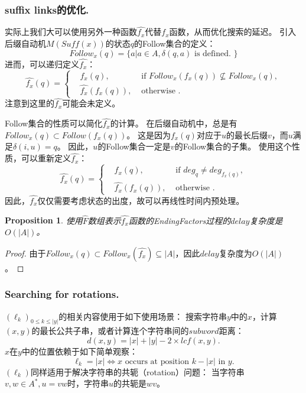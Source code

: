 \documentclass[UTF8]{ctexart}
\newtheorem{prop}[thm]{Proposition}
\theoremstyle{definition}
\theoremstyle{remark}
\numberwithin{equation}{subsection}
\newcommand{\Suff}{\textit{Suff}}
\begin{document}
\subsubsection{suffix links的优化.}	
	
	实际上我们大可以使用另外一种函数$\hat{f_x}$代替$f_x$函数，从而优化搜索的延迟。
	引入后缀自动机$M(\Suff(x))$的状态$q$的Follow集合的定义：
	\[
		Follow_x(q) = \{ a | a \in A, \delta(q, a) \text{ is defined. } \}
	\]
	进而，可以递归定义$\hat{f_x}$：
	\[
		\hat{f_x}(q) =
		\left\{
			\begin{aligned}
				&f_x(q),			&\text{ if } Follow_x(f_x(q)) \nsubseteq Follow_x(q),	\\
				&\hat{f_x}(f_x(q)),	&\text{ otherwise }.
			\end{aligned}
		\right .
	\]
	注意到这里的$\hat{f_x}$可能会未定义。
	
	Follow集合的性质可以简化$\hat{f_x}$的计算。
	在后缀自动机中，总是有$Follow_x(q) \subset Follow(f_x(q))$。
	这是因为$f_x(q)$对应于$u$的最长后缀$v$，而$u$满足$\delta(i, u) = q$。
	因此，$u$的Follow集合一定是$v$的Follow集合的子集。
	使用这个性质，可以重新定义$\hat{f_x}$：
	\[
		\hat{f_x}(q) =
		\left\{
			\begin{aligned}
				&f_x(q),		&\text{ if } deg_q \neq deg_{f_x(q)},	\\
				&\hat{f_x}(f_x(q)),	&\text{ otherwise }.
			\end{aligned}
		\right .
	\]
	因此，$\hat{f_x}$仅仅需要考虑状态的出度，故可以再线性时间内预处理。
	
	\begin{prop}
		使用$\hat{F}$数组表示$\hat{f_x}$函数的EndingFactors过程的$delay$复杂度是$O(|A|)$。
	\end{prop}
	\begin{proof}
		由于$Follow_x(q) \subset Follow_x(\hat{f_x}) \subseteq |A|$，因此$delay$复杂度为$O(|A|)$。
	\end{proof}
	
\subsubsection{Searching for rotations.}
	
	$(\ell_k)_{0 \le k \le |y|}$的相关内容使用于如下使用场景：
	搜索字符串$y$中的$x$，计算$(x,y)$的最长公共子串，或者计算连个字符串间的$subword$距离：
	\[
		d(x, y) = |x| + |y| - 2 \times lcf(x, y).
	\]
	$x$在$y$中的位置依赖于如下简单观察：
	\[
		\ell_k = |x| \Longleftrightarrow x \text{ occurs at position } k - |x| \text{ in } y.
	\]
	$(\ell_k)$同样适用于解决字符串的共轭（rotation）问题：
	当字符串$v,w \in A^*, u = vw$时，字符串$u$的共轭是$wv$。
\end{document}
